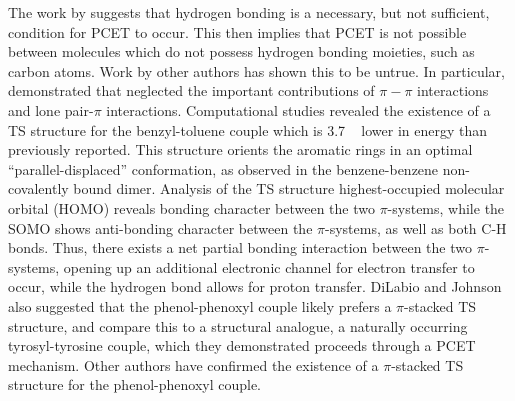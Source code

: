 The work by \citet{Mayer2002} suggests that hydrogen bonding is a necessary, but
not sufficient, condition for PCET to occur. This then implies that PCET is not
possible between molecules which do not possess hydrogen bonding moieties, such
as carbon atoms. Work by other authors has shown this to be
untrue.\cite{Hatcher2007, DiLabio2007} In particular, \citet{DiLabio2007}
demonstrated that \citet{Mayer2002} neglected the important contributions of
$\pi-\pi$ interactions and lone pair-$\pi$ interactions. Computational studies
revealed the existence of a TS structure for the benzyl-toluene couple which is
3.7 \kcalmol~ lower in energy than previously reported. This structure orients
the aromatic rings in an optimal ``parallel-displaced'' conformation, as
observed in the benzene-benzene non-covalently bound dimer.\cite{Sinnokrot2002}
Analysis of the TS structure highest-occupied molecular orbital (HOMO) reveals
bonding character between the two $\pi$-systems, while the SOMO shows
anti-bonding character between the $\pi$-systems, as well as both C-H bonds.
Thus, there exists a net partial bonding interaction between the two
$\pi$-systems, opening up an additional electronic channel for electron transfer
to occur, while the hydrogen bond allows for proton transfer.
DiLabio and Johnson also suggested that the phenol-phenoxyl couple likely
prefers a $\pi$-stacked TS structure, and compare this to a structural analogue,
a naturally occurring tyrosyl-tyrosine couple, which they demonstrated proceeds
through a PCET mechanism. Other authors have confirmed the existence of a
$\pi$-stacked TS structure for the phenol-phenoxyl couple.\cite{Sirjoosingh2011,
HammesSchiffer2015, MunozRugeles2017}

